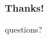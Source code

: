 \documentclass[11pt,reqno]{beamer}
\begin{document}
\begin{frame}\frametitle{Thanks!}
    questions?


\end{frame}
%









\end{document}
